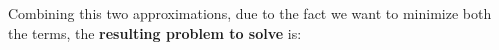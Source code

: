Combining this two approximations, due to the fact we want to minimize both the terms, the \textbf{resulting problem to solve} is: 

\hspace*{-5mm}
\begin{center}
\end{center}



